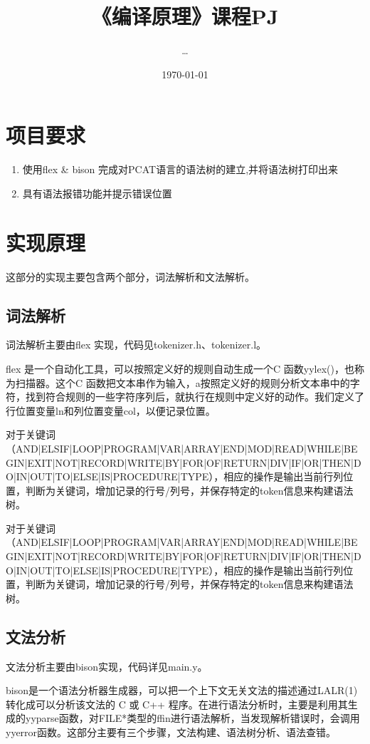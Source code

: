 \documentclass{article}
\title{《编译原理》课程PJ}
\author{\ldots}
\date{\today}
\begin{document}
\section{项目要求} %
\label{sec:项目要求}
\begin{enumerate}
  \item 使用flex \& bison 完成对PCAT语言的语法树的建立,并将语法树打印出来
  \item 具有语法报错功能并提示错误位置
\end{enumerate}

\section{实现原理} %
\label{sec:实现原理}
这部分的实现主要包含两个部分，词法解析和文法解析。

\subsection{词法解析} %
\label{sub:词法解析}
词法解析主要由flex 实现，代码见tokenizer.h、tokenizer.l。\par
flex 是一个自动化工具，可以按照定义好的规则自动生成一个C 函数yylex()，也称为扫描器。这个C 函数把文本串作为输入，a按照定义好的规则分析文本串中的字符，找到符合规则的一些字符序列后，就执行在规则中定义好的动作。我们定义了行位置变量ln和列位置变量col，以便记录位置。\par
对于关键词（AND|ELSIF|LOOP|PROGRAM|VAR|ARRAY|END|MOD|READ|WHILE|BEGIN|EXIT|NOT|RECORD|WRITE|BY|FOR|OF|RETURN|DIV|IF|OR|THEN|DO|IN|OUT|TO|ELSE|IS|PROCEDURE|TYPE），相应的操作是输出当前行列位置，判断为关键词，增加记录的行号/列号，并保存特定的token信息来构建语法树。\par
对于关键词（AND|ELSIF|LOOP|PROGRAM|VAR|ARRAY|END|MOD|READ|WHILE|BEGIN|EXIT|NOT|RECORD|WRITE|BY|FOR|OF|RETURN|DIV|IF|OR|THEN|DO|IN|OUT|TO|ELSE|IS|PROCEDURE|TYPE），相应的操作是输出当前行列位置，判断为关键词，增加记录的行号/列号，并保存特定的token信息来构建语法树。\par

\subsection{文法分析} %
\label{sub:文法分析}
文法分析主要由bison实现，代码详见main.y。\par
bison是一个语法分析器生成器，可以把一个上下文无关文法的描述通过LALR(1)转化成可以分析该文法的 C 或 C++ 程序。在进行语法分析时，主要是利用其生成的yyparse函数，对FILE*类型的ffin进行语法解析，当发现解析错误时，会调用yyerror函数。这部分主要有三个步骤，文法构建、语法树分析、语法查错。\par
\end{document}
